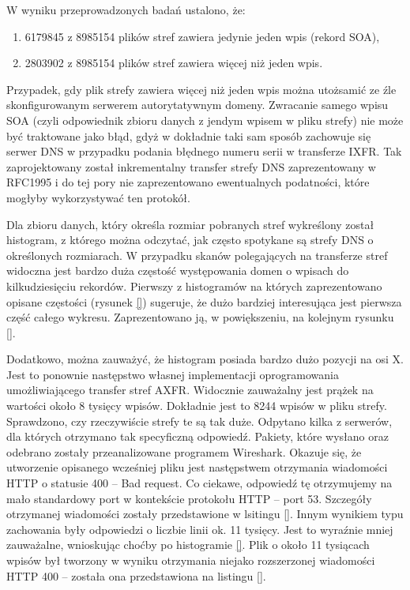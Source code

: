 W wyniku przeprowadzonych badań ustalono, że:
\begin{enumerate}
	\item 6179845 z 8985154 plików stref zawiera jedynie jeden wpis (rekord SOA),
	\item 2803902 z 8985154 plików stref zawiera więcej niż jeden wpis.
\end{enumerate}
Przypadek, gdy plik strefy zawiera więcej niż jeden wpis można utożsamić ze źle skonfigurowanym serwerem autorytatywnym domeny. Zwracanie samego wpisu SOA (czyli odpowiednik zbioru danych z jendym wpisem w pliku strefy) nie może być traktowane jako błąd, gdyż w dokładnie taki sam sposób zachowuje się serwer DNS w przypadku podania błędnego numeru serii w transferze IXFR. Tak zaprojektowany został inkrementalny transfer strefy DNS zaprezentowany w RFC1995\cite{RFC1995} i do tej pory nie zaprezentowano ewentualnych podatności, które mogłyby wykorzystywać ten protokół.

Dla zbioru danych, który określa rozmiar pobranych stref wykreślony został histogram, z którego można odczytać, jak często spotykane są strefy DNS o określonych rozmiarach. W przypadku skanów polegających na transferze stref widoczna jest bardzo duża częstość występowania domen o wpisach do kilkudziesięciu rekordów. Pierwszy z histogramów na których zaprezentowano opisane częstości (rysunek \ref{}) sugeruje, że dużo bardziej interesująca jest pierwsza część całego wykresu. Zaprezentowano ją, w powiększeniu, na kolejnym rysunku \ref{}.

Dodatkowo, można zauważyć, że histogram posiada bardzo dużo pozycji na osi X. Jest to ponownie następstwo własnej implementacji oprogramowania umożliwiającego transfer stref AXFR. Widocznie zauważalny jest prążek na wartości około 8 tysięcy wpisów. Dokładnie jest to 8244 wpisów w pliku strefy. Sprawdzono, czy rzeczywiście strefy te są tak duże. Odpytano kilka z serwerów, dla których otrzymano tak specyficzną odpowiedź. Pakiety, które wysłano oraz odebrano zostały przeanalizowane programem Wireshark. Okazuje się, że utworzenie opisanego wcześniej pliku jest następstwem otrzymania wiadomości HTTP o statusie 400 -- Bad request. Co ciekawe, odpowiedź tę otrzymujemy na mało standardowy port w kontekście protokołu HTTP -- port 53. Szczegóły otrzymanej wiadomości zostały przedstawione w lsitingu \ref{}. Innym wynikiem typu zachowania były odpowiedzi o liczbie linii ok. 11 tysięcy. Jest to wyraźnie mniej zauważalne, wnioskując choćby po histogramie \ref{}. Plik o około 11 tysiącach wpisów był tworzony w wyniku otrzymania niejako rozszerzonej wiadomości HTTP 400 -- została ona przedstawiona na listingu \ref{}.

